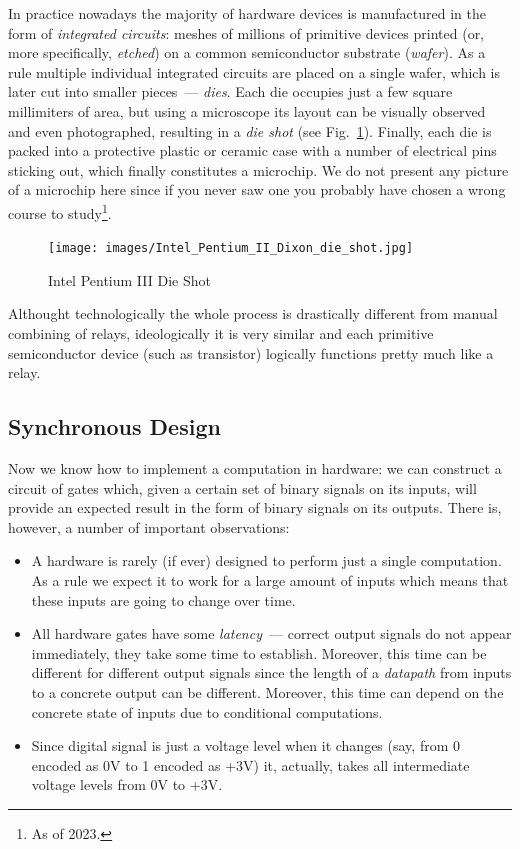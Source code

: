In practice nowadays the majority of hardware devices is manufactured in the form of \emph{integrated circuits}: meshes
of millions of primitive devices printed (or, more specifically, \emph{etched}) on a common semiconductor substrate (\emph{wafer}).
As a rule multiple individual integrated circuits are placed on a single wafer, which is later cut into smaller
pieces~--- \emph{dies}. Each die occupies just a few square millimiters of area, but using a microscope its
layout can be visually observed and even photographed, resulting in a \emph{die shot} (see Fig.~\ref{die-shot}).
Finally, each die is packed into a protective plastic or ceramic case with a number of electrical pins sticking out, which
finally constitutes a microchip. We do not present any picture of a microchip here since if you never saw one you
probably have chosen a wrong course to study\footnote{As of 2023.}.

\begin{figure}[t]
  \centering
  \texttt{[image: images/Intel\_Pentium\_II\_Dixon\_die\_shot.jpg]}
  \caption{Intel Pentium III Die Shot}
  \label{die-shot}
\end{figure}

Althought technologically the whole process is drastically different from manual combining of relays, ideologically
it is very similar and each primitive semiconductor device (such as transistor) logically functions pretty much
like a relay. 

\subsection{Synchronous Design}

Now we know how to implement a computation in hardware: we can construct a circuit of gates which,
given a certain set of binary signals on its inputs, will provide an expected result in the form of binary signals on
its outputs. There is, however, a number of important observations:

\begin{itemize}
\item A hardware is rarely (if ever) designed to perform just a single computation. As a rule
  we expect it to work for a large amount of inputs which means that these inputs are going to
  change over time.
\item All hardware gates have some \emph{latency}~--- correct output signals do not appear immediately, they
  take some time to establish. Moreover, this time can be different for different output signals since
  the length of a \emph{datapath} from inputs to a concrete output can be different. Moreover, this
  time can depend on the concrete state of inputs due to conditional computations.
\item Since digital signal is just a voltage level when it changes (say, from 0 encoded as 0V to 1 encoded as +3V) it, actually,
  takes all intermediate voltage levels from 0V to +3V.  
\end{itemize}


